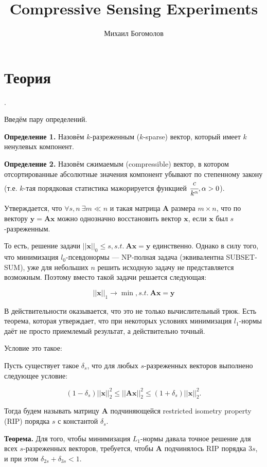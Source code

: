 \documentclass{article}
\def\*#1{\mathbf{#1}}
\begin{document}
\author{Михаил Богомолов}
\title{Compressive Sensing Experiments}
\date{}
\maketitle

\section{Теория}.

Введём пару определений.

\textbf{Определение 1.} Назовём $k$-разреженным ($k$-sparse) вектор, который имеет $k$ ненулевых компонент.

\textbf{Определение 2.} Назовём сжимаемым (compressible) вектор, в котором отсортированные абсолютные значения компонент убывают по степенному закону (т.е. $k$-тая порядковая статистика мажорируется функцией $\cfrac{c}{k^\alpha}, \alpha > 0$).

Утверждается, что $\forall s, n\ \exists m \ll n$ и такая матрица $\*A$ размера $m \times n$, что по вектору $\*y = \*A\*x$ можно однозначно восстановить вектор $\*x$, если $\*x$ был $s$-разреженным.

То есть, решение задачи $||\*x||_0 \leq s, s.t.\ \*A\*x = \*y$ единственно. Однако в силу того, что минимизация $l_0$-псевдонормы --- NP-полная задача (эквивалентна \textsf{SUBSET-SUM}), уже для небольших $n$ решить исходную задачу не представляется возможным. Поэтому вместо такой задачи решается следующая:

$$||\*x||_1 \to \min, s.t.\ \*A\*x = \*y$$

В действительности оказывается, что это не только вычислительный трюк. Есть теорема, которая утверждает, что при некоторых условиях минимизация $l_1$-нормы даёт не просто приемлемый результат, а действительно точный.

Условие это такое:

Пусть существует такое $\delta_{s}$, что для любых $s$-разреженных векторов выполнено следующее условие:

$$(1 - \delta_{s}) ||\*x||_2^2 \leq ||\*A\*x||_2^2 \leq (1 + \delta_{s}) ||\*x||_2^2.$$

Тогда будем называть матрицу $\*A$ подчиняющейся restricted isometry property (RIP) порядка $s$ с константой $\delta_s$.

\textbf{Теорема.} Для того, чтобы минимизация $L_1$-нормы давала точное решение для всех $s$-разреженных векторов, требуется, чтобы $\*A$ подчинялось RIP порядка $3s$, и при этом $\delta_{2s} + \delta_{3s} < 1.$ 
\end{document}
